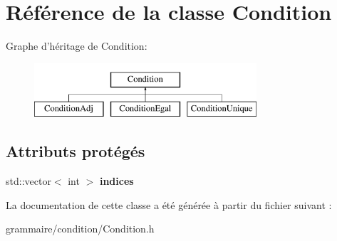 \hypertarget{class_condition}{\section{Référence de la classe Condition}
\label{class_condition}
}
Graphe d'héritage de Condition\-:\begin{figure}[H]
\begin{center}
\leavevmode
\includegraphics[height=2.000000cm]{class_condition}
\end{center}
\end{figure}
\subsection*{Attributs protégés}
\begin{DoxyCompactItemize}
\item 
\hypertarget{class_condition_a726c00e2c44548b135ea5c137ba836d2}{std\-::vector$<$ int $>$ {\bfseries indices}}\label{class_condition_a726c00e2c44548b135ea5c137ba836d2}

\end{DoxyCompactItemize}


La documentation de cette classe a été générée à partir du fichier suivant \-:\begin{DoxyCompactItemize}
\item 
grammaire/condition/Condition.\-h\end{DoxyCompactItemize}
